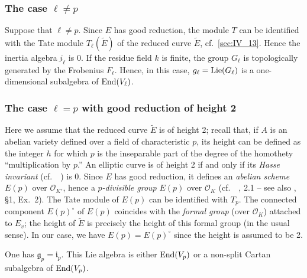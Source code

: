 \begin{subappendices}
\subsubsection{The case \texorpdfstring{$\ell \ne p$}{ℓ ̸/= p}}
\label{sec:IV_A21}

Suppose that $\ell \neq p$. Since $E$ has good reduction, the module
$T$ can be identified with the Tate module $T_\ell(\tilde{E})$ of the reduced
curve $\tilde{E}$, cf.\ \ref{sec:IV_13}. Hence the inertia algebra
$\underbar{i}_\ell$ is $0$. If the residue field $k$ is finite, the group
$G_\ell$ is topologically generated by the Frobenius $F_\ell$. Hence, in this
case, $g_\ell = \operatorname{Lie}(G_\ell)$ is a one-dimensional subalgebra of $\operatorname{End}(V_\ell)$.

\subsubsection{The case \texorpdfstring{$\ell = p$}{ℓ = p} with good
reduction of height 2}
\label{sec:IV_A22}
Here we assume that the reduced curve $\widetilde{E}$ is of height 2; recall
that, if $A$ is an abelian variety defined over a field of characteristic $p$,
its height can be defined as the integer $h$ for which $p$ is the inseparable
part of the degree of the homothety ``multiplication by $p$.'' An elliptic
curve is of height 2 if and only if its \emph{Hasse invariant} (cf.\
\citeauthor{9}~\cite{9}) is 0. Since $E$ has good reduction, it defines an
\emph{abelian scheme} $E(p)$ over $\mathcal{O}_{K'}$, hence a
\emph{$p$-divisible group} $E(p)$ over $\mathcal{O}_K$ (cf.\
\citeauthor{39}~\cite{39}, 2.1 -- see also \cite{26}, \S1, Ex.~2).  The Tate
module of $E(p)$ can be identified with $T_p$. The connected component
$E(p)^\circ$ of $E(p)$ coincides with the \emph{formal group} (over
$\mathcal{O}_K$) attached to $E_v$; the height of $\widetilde{E}$ is precisely
the height of this formal group (in the usual sense). In our case, we have
$E(p) = E(p)^\circ$ since the height is assumed to be 2.

\begin{thm}
	One has $\mathfrak{g}_p = \mathfrak{i}_p$. This Lie algebra is either
	$\operatorname{End}(V_p)$ or a non-split Cartan subalgebra of $\operatorname{End}(V_p)$.
\end{thm}


\end{subappendices}
